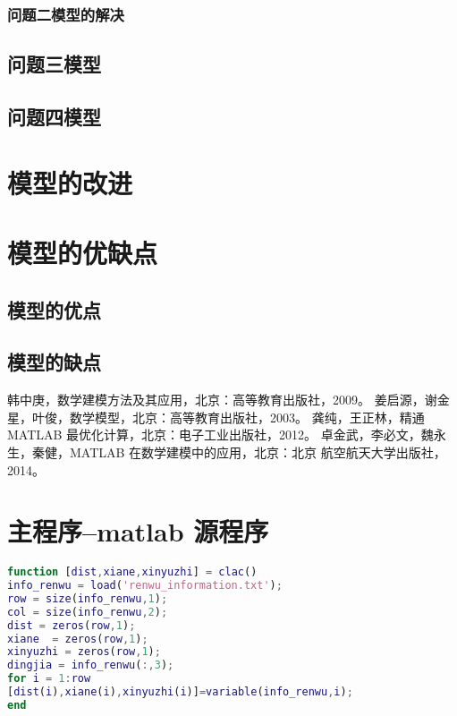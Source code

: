 \documentclass[withoutpreface,bwprint]{cumcmthesis} %
\begin{document}
\subsubsection{问题二模型的解决}

 
\subsection{问题三模型}

\subsection{问题四模型}


\section{模型的改进}


\section{模型的优缺点}
\subsection{模型的优点}

\subsection{模型的缺点}



\begin{thebibliography}{9}%
  韩中庚，数学建模方法及其应用，北京：高等教育出版社，2009。 
 姜启源，谢金星，叶俊，数学模型，北京：高等教育出版社，2003。 
 龚纯，王正林，精通 MATLAB 最优化计算，北京：电子工业出版社，2012。 
 卓金武，李必文，魏永生，秦健，MATLAB 在数学建模中的应用，北京：北京 航空航天大学出版社，2014。

\end{thebibliography}

\newpage
\appendix
\section{主程序--matlab 源程序}
\begin{lstlisting}[language=matlab]
function [dist,xiane,xinyuzhi] = clac()
info_renwu = load('renwu_information.txt');
row = size(info_renwu,1);
col = size(info_renwu,2);
dist = zeros(row,1);
xiane  = zeros(row,1);
xinyuzhi = zeros(row,1);
dingjia = info_renwu(:,3);
for i = 1:row
[dist(i),xiane(i),xinyuzhi(i)]=variable(info_renwu,i); 
end

 \end{lstlisting}
\end{document}
